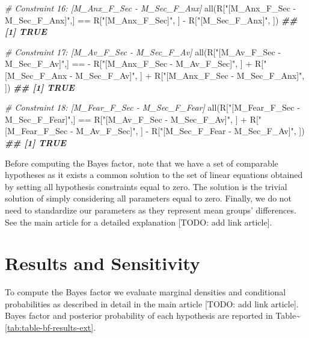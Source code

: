 \documentclass[
]{book}
\newenvironment{Shaded}{\begin{snugshade}}{\end{snugshade}}
\newcommand{\CommentTok}[1]{\textcolor[rgb]{0.56,0.35,0.01}{\textit{#1}}}
\newcommand{\DocumentationTok}[1]{\textcolor[rgb]{0.56,0.35,0.01}{\textbf{\textit{#1}}}}
\newcommand{\FunctionTok}[1]{\textcolor[rgb]{0.00,0.00,0.00}{#1}}
\newcommand{\NormalTok}[1]{#1}
\newcommand{\SpecialCharTok}[1]{\textcolor[rgb]{0.00,0.00,0.00}{#1}}
\newcommand{\StringTok}[1]{\textcolor[rgb]{0.31,0.60,0.02}{#1}}
\begin{document}
\begin{Shaded}
\begin{Highlighting}[]
\CommentTok{\# Constraint 16: [M\_Anx\_F\_Sec {-} M\_Sec\_F\_Anx]}
\FunctionTok{all}\NormalTok{(R[}\StringTok{"[M\_Anx\_F\_Sec {-} M\_Sec\_F\_Anx]"}\NormalTok{,] }\SpecialCharTok{==}\NormalTok{ R[}\StringTok{"[M\_Anx\_F\_Sec]"}\NormalTok{, ] }\SpecialCharTok{{-}}\NormalTok{ R[}\StringTok{"[M\_Sec\_F\_Anx]"}\NormalTok{, ])}
\DocumentationTok{\#\# [1] TRUE}

\CommentTok{\# Constraint 17: [M\_Av\_F\_Sec {-} M\_Sec\_F\_Av]}
\FunctionTok{all}\NormalTok{(R[}\StringTok{"[M\_Av\_F\_Sec {-} M\_Sec\_F\_Av]"}\NormalTok{,] }\SpecialCharTok{==} \SpecialCharTok{{-}}\NormalTok{ R[}\StringTok{"[M\_Anx\_F\_Sec {-} M\_Av\_F\_Sec]"}\NormalTok{, ] }\SpecialCharTok{+}\NormalTok{ R[}\StringTok{"[M\_Sec\_F\_Anx {-} M\_Sec\_F\_Av]"}\NormalTok{, ] }\SpecialCharTok{+}\NormalTok{  R[}\StringTok{"[M\_Anx\_F\_Sec {-} M\_Sec\_F\_Anx]"}\NormalTok{, ])}
\DocumentationTok{\#\# [1] TRUE}

\CommentTok{\# Constraint 18: [M\_Fear\_F\_Sec {-} M\_Sec\_F\_Fear] }
\FunctionTok{all}\NormalTok{(R[}\StringTok{"[M\_Fear\_F\_Sec {-} M\_Sec\_F\_Fear]"}\NormalTok{,] }\SpecialCharTok{==}\NormalTok{ R[}\StringTok{"[M\_Av\_F\_Sec {-} M\_Sec\_F\_Av]"}\NormalTok{, ] }\SpecialCharTok{+}\NormalTok{ R[}\StringTok{"[M\_Fear\_F\_Sec {-} M\_Av\_F\_Sec]"}\NormalTok{, ] }\SpecialCharTok{{-}}\NormalTok{ R[}\StringTok{"[M\_Sec\_F\_Fear {-} M\_Sec\_F\_Av]"}\NormalTok{, ])}
\DocumentationTok{\#\# [1] TRUE}
\end{Highlighting}
\end{Shaded}

Before computing the Bayes factor, note that we have a set of comparable hypotheses as it exists a common solution to the set of linear equations obtained by setting all hypothesis constraints equal to zero. The solution is the trivial solution of simply considering all parameters equal to zero. Finally, we do not need to standardize our parameters as they represent mean groups' differences. See the main article for a detailed explanation {[}TODO: add link article{]}.

\hypertarget{results-and-sensitivity}{%
\section{Results and Sensitivity}\label{results-and-sensitivity}}

To compute the Bayes factor we evaluate marginal densities and conditional probabilities as described in detail in the main article {[}TODO: add link article{]}. Bayes factor and posterior probability of each hypothesis are reported in Table\textasciitilde\ref{tab:table-bf-results-ext}.
\end{document}
